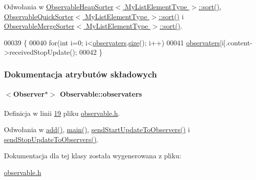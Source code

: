 Odwołania w \hyperlink{observableheapsorter_8h_source_l00026}{Observable\-Heap\-Sorter$<$ My\-List\-Element\-Type $>$\-::sort()}, \hyperlink{observablequicksorter_8h_source_l00026}{Observable\-Quick\-Sorter$<$ My\-List\-Element\-Type $>$\-::sort()} i \hyperlink{observablemergesorter_8h_source_l00026}{Observable\-Merge\-Sorter$<$ My\-List\-Element\-Type $>$\-::sort()}.


\begin{DoxyCode}
00039                                       \{
00040         \textcolor{keywordflow}{for}(\textcolor{keywordtype}{int} i=0; i<\hyperlink{class_observable_a23f06cfbce27372d95fb556ca1f392ee}{observaters}.\hyperlink{class_my_list_a267f669859ef3541333082cad6b28ab7}{size}(); i++)
00041                 \hyperlink{class_observable_a23f06cfbce27372d95fb556ca1f392ee}{observaters}[i].content->receivedStopUpdate();
00042     \}
\end{DoxyCode}


\subsubsection{Dokumentacja atrybutów składowych}
\hypertarget{class_observable_a23f06cfbce27372d95fb556ca1f392ee}{
\paragraph[{observaters}]{$<${\bf Observer}$\ast$$>$ Observable\-::observaters}}\label{class_observable_a23f06cfbce27372d95fb556ca1f392ee}


Definicja w linii \hyperlink{observable_8h_source_l00019}{19} pliku \hyperlink{observable_8h_source}{observable.\-h}.



Odwołania w \hyperlink{observable_8h_source_l00023}{add()}, \hyperlink{main_8cpp_source_l00022}{main()}, \hyperlink{observable_8h_source_l00029}{send\-Start\-Update\-To\-Observers()} i \hyperlink{observable_8h_source_l00039}{send\-Stop\-Update\-To\-Observers()}.



Dokumentacja dla tej klasy została wygenerowana z pliku\-:\begin{DoxyCompactItemize}
\item 
\hyperlink{observable_8h}{observable.\-h}\end{DoxyCompactItemize}
